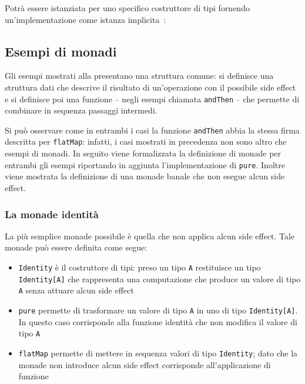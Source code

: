 Potrà essere istanziata per uno specifico costruttore di tipi fornendo un'implementazione come istanza implicita~\cite{cit:scala-book-type-classes}:

\subsection{Esempi di monadi}
Gli esempi mostrati alla  presentano una struttura comune: si definisce una struttura dati che descrive il risultato di un'operazione con il possibile side effect e si definisce poi una funzione -- negli esempi chiamata \lstinline{andThen} -- che permette di combinare in sequenza passaggi intermedi.

Si può osservare come in entrambi i casi la funzione \lstinline{andThen} abbia la stessa firma descritta per \lstinline{flatMap}: infatti, i casi mostrati in precedenza non sono altro che esempi di monadi. In seguito viene formalizzata la definizione di monade per entrambi gli esempi riportando in aggiunta l'implementazione di \lstinline{pure}. Inoltre viene mostrata la definizione di una monade banale che non esegue alcun side effect.

\subsubsection{La monade identità}
\label{la-monade-identita}
La più semplice monade possibile è quella che non applica alcun side effect. Tale monade può essere definita come segue:

\begin{itemize}
  \item \lstinline{Identity} è il costruttore di tipi: preso un tipo \lstinline{A} restituisce un tipo \lstinline{Identity[A]} che rappresenta una computazione che produce un valore di tipo \lstinline{A} senza attuare alcun side effect
  \item \lstinline{pure} permette di trasformare un valore di tipo  \lstinline{A} in uno di tipo \lstinline{Identity[A]}. In questo caso corrisponde alla funzione identità che non modifica il valore di tipo \lstinline{A}
  \item \lstinline{flatMap} permette di mettere in sequenza valori di tipo \lstinline{Identity}; dato che la monade non introduce alcun side effect corrisponde all'applicazione di funzione
\end{itemize}

